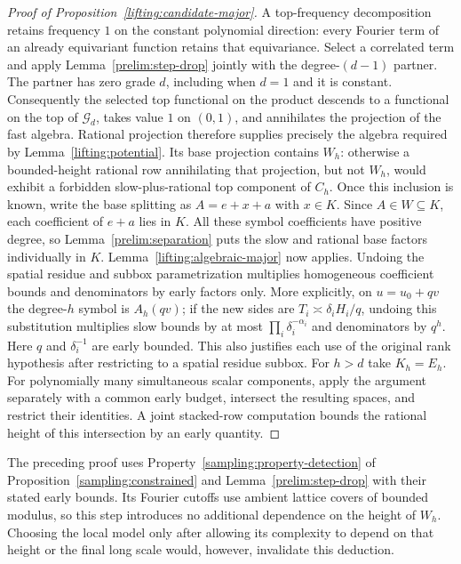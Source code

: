 \begin{proof}[Proof of Proposition~\ref{lifting:candidate-major}]
A top-frequency decomposition retains frequency $1$ on the constant
polynomial direction: every Fourier term of an already equivariant
function retains that equivariance.  Select a correlated term and
apply Lemma~\ref{prelim:step-drop} jointly with the degree-$(d-1)$
partner.  The partner has zero grade $d$, including when $d=1$ and
it is constant.  Consequently the selected top functional on the
product descends to a functional on the top of $\mathscr G_d$,
takes value $1$ on $(0,1)$, and annihilates the projection of the
fast algebra.  Rational projection therefore supplies precisely the
algebra required by Lemma~\ref{lifting:potential}.  Its base
projection contains $W_h$: otherwise a bounded-height rational row
annihilating that projection, but not $W_h$, would exhibit a forbidden
slow-plus-rational top component of $C_h$.  Once this inclusion is
known, write the base splitting as $A=e+x+a$ with $x\in K$.
Since $A\in W\subseteq K$, each coefficient of $e+a$ lies in $K$.
All these symbol coefficients have positive degree, so
Lemma~\ref{prelim:separation} puts the slow and rational base factors
individually in $K$.
Lemma~\ref{lifting:algebraic-major} now applies.  Undoing the spatial
residue and subbox parametrization multiplies homogeneous coefficient
bounds and denominators by early factors only.  More explicitly,
on $u=u_0+qv$ the degree-$h$ symbol is $A_h(qv)$;
if the new sides are $T_i\asymp\delta_iH_i/q$, undoing this
substitution multiplies slow bounds by at most
$\prod_i\delta_i^{-\alpha_i}$ and denominators by $q^h$.
Here $q$ and $\delta_i^{-1}$ are early bounded.  This also justifies
each use of the original rank hypothesis after restricting to a
spatial residue subbox.  For $h>d$ take
$K_h=E_h$.  For polynomially many simultaneous scalar components,
apply the argument separately with a common early budget, intersect
the resulting spaces, and restrict their identities.  A joint
stacked-row computation bounds the rational height of this
intersection by an early quantity.
\end{proof}

\begin{remark}
\label{lifting:major-gap}
The preceding proof uses Property~\ref{sampling:property-detection}
of Proposition~\ref{sampling:constrained} and
Lemma~\ref{prelim:step-drop} with their stated early bounds.
Its Fourier cutoffs use ambient lattice covers of
bounded modulus, so this step introduces no additional dependence on
the height of $W_h$.  Choosing the local model only after allowing
its complexity to depend on that height or the final long scale
would, however, invalidate this deduction.
\end{remark}

